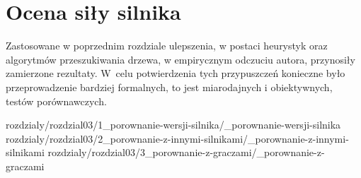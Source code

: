 
\chapter {Ocena siły silnika}
\label {ch: ocena-sily-silnika}

Zastosowane w poprzednim rozdziale ulepszenia, w postaci heurystyk oraz algorytmów przeszukiwania drzewa, w empirycznym odczuciu autora, przynosiły zamierzone rezultaty.
W~celu potwierdzenia tych przypuszczeń konieczne było przeprowadzenie bardziej formalnych, to jest miarodajnych i obiektywnych, testów porównawczych.

 {rozdzialy/rozdzial03/1_porownanie-wersji-silnika/_porownanie-wersji-silnika}
 {rozdzialy/rozdzial03/2_porownanie-z-innymi-silnikami/_porownanie-z-innymi-silnikami}
 {rozdzialy/rozdzial03/3_porownanie-z-graczami/_porownanie-z-graczami}


